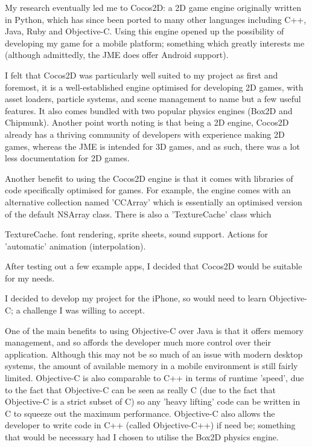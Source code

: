\documentclass[a4paper,oneside]{report}
\begin{document}
My research eventually led me to Cocos2D: a 2D game engine originally written in Python, which has since been ported to many other languages including C++, Java, Ruby and Objective-C. Using this engine opened up the possibility of developing my game for a mobile platform; something which greatly interests me (although admittedly, the JME does offer Android support).

I felt that Cocos2D was particularly well suited to my project as first and foremost, it is a well-established engine optimised for developing 2D games, with asset loaders, particle systems, and scene management to name but a few useful features. It also comes bundled with two popular physics engines (Box2D and Chipmunk). Another point worth noting is that being a 2D engine, Cocos2D already has a thriving community of developers with experience making 2D games, whereas the JME is intended for 3D games, and as such, there was a lot less documentation for 2D games.

Another benefit to using the Cocos2D engine is that it comes with libraries of code specifically optimised for games. For example, the engine comes with an alternative collection named 'CCArray' which is essentially an optimised version of the default NSArray class. There is also a 'TextureCache' class which 

TextureCache. font rendering, sprite sheets, sound support. Actions for 'automatic' animation (interpolation).

After testing out a few example apps, I decided that Cocos2D would be suitable for my needs. 

I decided to develop my project for the iPhone, so would need to learn Objective-C; a challenge I was willing to accept. 

One of the main benefits to using Objective-C over Java is that it offers memory management, and so affords the developer much more control over their application. Although this may not be so much of an issue with modern desktop systems, the amount of available memory in a mobile environment is still fairly limited. Objective-C is also comparable to C++ in terms of runtime 'speed', due to the fact that Objective-C can be seen as really C (due to the fact that Objective-C is a strict subset of C) so any 'heavy lifting' code can be written in C to squeeze out the maximum performance. Objective-C also allows the developer to write code in C++ (called Objective-C++) if need be; something that would be necessary had I chosen to utilise the Box2D physics engine.
\end{document}
